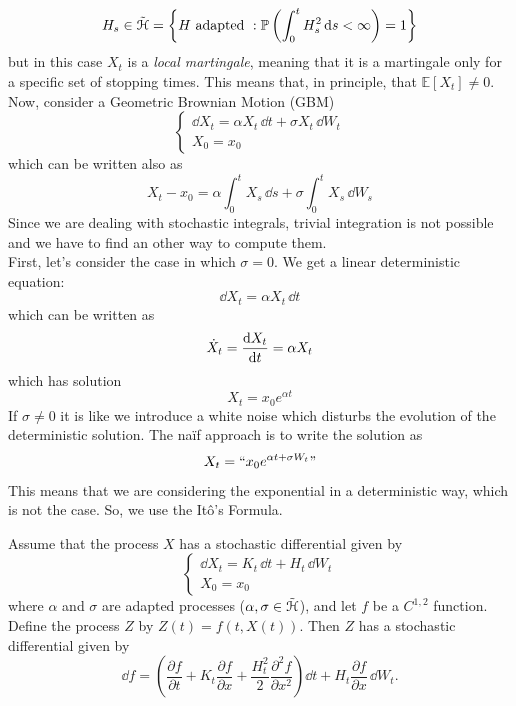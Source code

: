 \begin{equation*}
    H_s \in \Tilde{\mathcal{H}} = \bigg\{H\mbox{ adapted }: \mathbb{P}\left(\int_0^t H^2_s\,\dd s <\infty\right)=1\bigg\}
\end{equation*}
but in this case $X_t$ is a \emph{local martingale}, meaning that it is a martingale only for a specific set of stopping times. This means that, in principle, that $\mathbb{E}[X_t]\ne0$.\\
Now, consider a Geometric Brownian Motion (GBM)
\begin{equation}
    \begin{cases}
    \dd X_t = \alpha X_t\, \dd t + \sigma X_t\, \dd W_t\\
    X_0 = x_0
    \end{cases}
\end{equation}
which can be written also as
\begin{equation}
    X_t - x_0 = \alpha\int^t_0 X_s\, \dd s + \sigma\int^t_0 X_s \,\dd W_s
\end{equation}
Since we are dealing with stochastic integrals, trivial integration is not possible and we have to find an other way to compute them. \\
First, let's consider the case in which $\sigma=0$. We get a linear deterministic equation:
\begin{equation}
    \dd X_t = \alpha X_t\, \dd t 
\end{equation}
which can be written as 
\begin{equation}
    \Dot{X}_t = \dv{X_t}{t} = \alpha X_t
\end{equation}
which has solution
\begin{equation}\label{detsol}
    X_t = x_0e^{\alpha t}
\end{equation}
If $\sigma\ne0$ it is like we introduce a white noise which disturbs the evolution of the deterministic solution. The naïf approach is to write the solution as 
\begin{equation}
    X_t = ``x_0e^{\alpha t + \sigma W_t}"
\end{equation}
This means that we are considering the exponential in a deterministic way, which is not the case. So, we use the Itô's Formula.
\begin{theorem}
    Assume that the process $X$ has a stochastic differential given by
    \begin{equation}
    \begin{cases}
        \dd X_t = K_t\, \dd t + H_t\, \dd W_t\\
        X_0 = x_0
    \end{cases}
    \end{equation}
    where $\alpha$ and $\sigma$ are adapted processes ($\alpha,\sigma\in\Tilde{\mathcal{H}}$), and let $f$ be a $C^{1,2}$ function. Define the process $Z$ by $Z(t) = f(t,X(t))$. Then $Z$ has a stochastic differential given by
    \begin{equation}\label{ito}
        \dd f=\left({\frac{\partial f}{\partial t}}+K_{t}{\frac {\partial f}{\partial x}}+{\frac{H_{t}^{2}}{2}}{\frac{\partial ^{2}f}{\partial x^{2}}}\right)\dd t+H_{t}{\frac{\partial f}{\partial x}}\,\dd W_{t}.
    \end{equation}
\end{theorem}
